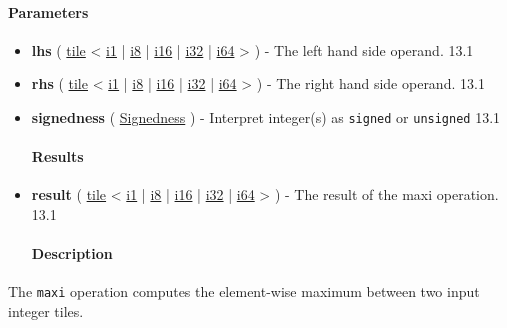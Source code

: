 \documentclass{article}
\begin{document}
\paragraph{Parameters}

\begin{itemize}
\item \textbf{lhs} ( \href{https://docs.nvidia.com/cuda/tile-ir/latest/sections/types.html#type-tile}{tile} < \href{https://docs.nvidia.com/cuda/tile-ir/latest/sections/types.html#subsection-element-types}{i1} | \href{https://docs.nvidia.com/cuda/tile-ir/latest/sections/types.html#subsection-element-types}{i8} | \href{https://docs.nvidia.com/cuda/tile-ir/latest/sections/types.html#subsection-element-types}{i16} | \href{https://docs.nvidia.com/cuda/tile-ir/latest/sections/types.html#subsection-element-types}{i32} | \href{https://docs.nvidia.com/cuda/tile-ir/latest/sections/types.html#subsection-element-types}{i64} > ) - The left hand side operand. 13.1
\item \textbf{rhs} ( \href{https://docs.nvidia.com/cuda/tile-ir/latest/sections/types.html#type-tile}{tile} < \href{https://docs.nvidia.com/cuda/tile-ir/latest/sections/types.html#subsection-element-types}{i1} | \href{https://docs.nvidia.com/cuda/tile-ir/latest/sections/types.html#subsection-element-types}{i8} | \href{https://docs.nvidia.com/cuda/tile-ir/latest/sections/types.html#subsection-element-types}{i16} | \href{https://docs.nvidia.com/cuda/tile-ir/latest/sections/types.html#subsection-element-types}{i32} | \href{https://docs.nvidia.com/cuda/tile-ir/latest/sections/types.html#subsection-element-types}{i64} > ) - The right hand side operand. 13.1
\item \textbf{signedness} ( \href{https://docs.nvidia.com/cuda/tile-ir/latest/sections/operations.html#op-attribute-cuda-tile-maxi-signedness-attr}{Signedness} ) - Interpret integer(s) as \texttt{signed} or \texttt{unsigned} 13.1


\paragraph{Results}

\item \textbf{result} ( \href{https://docs.nvidia.com/cuda/tile-ir/latest/sections/types.html#type-tile}{tile} < \href{https://docs.nvidia.com/cuda/tile-ir/latest/sections/types.html#subsection-element-types}{i1} | \href{https://docs.nvidia.com/cuda/tile-ir/latest/sections/types.html#subsection-element-types}{i8} | \href{https://docs.nvidia.com/cuda/tile-ir/latest/sections/types.html#subsection-element-types}{i16} | \href{https://docs.nvidia.com/cuda/tile-ir/latest/sections/types.html#subsection-element-types}{i32} | \href{https://docs.nvidia.com/cuda/tile-ir/latest/sections/types.html#subsection-element-types}{i64} > ) - The result of the maxi operation. 13.1


\paragraph{Description}

\end{itemize}
The \texttt{maxi} operation computes the element-wise maximum between two input integer tiles.
\end{document}
